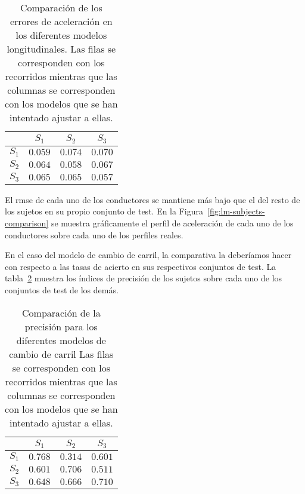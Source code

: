 \begin{table}
	\centering
	\caption[Comparación de los errores de aceleración en los diferentes modelos longitudinales]{Comparación de los errores de aceleración en los diferentes modelos longitudinales. Las filas se corresponden con los recorridos mientras que las columnas se corresponden con los modelos que se han intentado ajustar a ellas.}
	\label{tbl:lm-subjects-comparison}
	\begin{tabular}{cccc}
		\toprule
		& $S_1$ & $S_2$ & $S_3$ \\
		\midrule
		\rowcolor{black!20} $S_1$ & $0.059$        & $0.074$        & $0.070$ \\
		$S_2$ & $0.064$        & $0.058$        & $0.067$ \\
		\rowcolor{black!20} $S_3$ & $0.065$        & $0.065$        & $0.057$ \\
		\bottomrule
	\end{tabular}
\end{table}

El \ac{rmse} de cada uno de los conductores se mantiene más bajo que el del resto de los sujetos en su propio conjunto de test. En la Figura~\ref{fig:lm-subjects-comparison} se muestra gráficamente el perfil de aceleración de cada uno de los conductores sobre cada uno de los perfiles reales.

En el caso del modelo de cambio de carril, la comparativa la deberíamos hacer con respecto a las tasas de acierto en sus respectivos conjuntos de test. La tabla~\ref{tbl:lc-subjects-comparison} muestra los índices de precisión de los sujetos sobre cada uno de los conjuntos de test de los demás.

\begin{table}
	\centering
	\caption[Comparación de la precisión para los diferentes modelos de cambio de carril]{Comparación de la precisión para los diferentes modelos de cambio de carril Las filas se corresponden con los recorridos mientras que las columnas se corresponden con los modelos que se han intentado ajustar a ellas.}
	\label{tbl:lc-subjects-comparison}
	\begin{tabular}{cccc}
		\toprule
		& $S_1$ & $S_2$ & $S_3$ \\
		\midrule
		\rowcolor{black!20} $S_1$ & $0.768$ & $0.314$ & $0.601$ \\
		$S_2$ & $0.601$ & $0.706$ & $0.511$ \\
		\rowcolor{black!20} $S_3$ & $0.648$ & $0.666$ & $0.710$ \\
		\bottomrule
	\end{tabular}
\end{table}